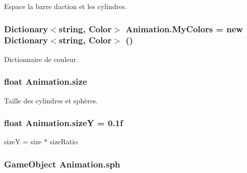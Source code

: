Espace la barre d\textquotesingle{}action et les cylindres. 

\hypertarget{class_animation_a294f170c53019f262d91e616410ae09c}{}
\subsubsection[{My\+Colors}]{\setlength{\rightskip}{0pt plus 5cm}Dictionary$<$string, Color$>$ Animation.\+My\+Colors = new Dictionary$<$string, Color$>$ ()\hspace{0.3cm}{\ttfamily [private]}}\label{class_animation_a294f170c53019f262d91e616410ae09c}


Dictionnaire de couleur. 

\hypertarget{class_animation_a89c2ae66fd6defd82f2f3ff5f82b4f4d}{}
\subsubsection[{size}]{\setlength{\rightskip}{0pt plus 5cm}float Animation.\+size\hspace{0.3cm}{\ttfamily [private]}}\label{class_animation_a89c2ae66fd6defd82f2f3ff5f82b4f4d}


Taille des cylindres et sphères. 

\hypertarget{class_animation_a989c075387e746acc254fe2eeb83fb4c}{}
\subsubsection[{size\+Y}]{\setlength{\rightskip}{0pt plus 5cm}float Animation.\+size\+Y = 0.\+1f\hspace{0.3cm}{\ttfamily [private]}}\label{class_animation_a989c075387e746acc254fe2eeb83fb4c}


size\+Y = size $\ast$ size\+Ratio 

\hypertarget{class_animation_af7fc2df5c0ddc866cdbe608f31642dee}{}
\subsubsection[{sph}]{\setlength{\rightskip}{0pt plus 5cm}Game\+Object Animation.\+sph\hspace{0.3cm}{\ttfamily [private]}}\label{class_animation_af7fc2df5c0ddc866cdbe608f31642dee}


